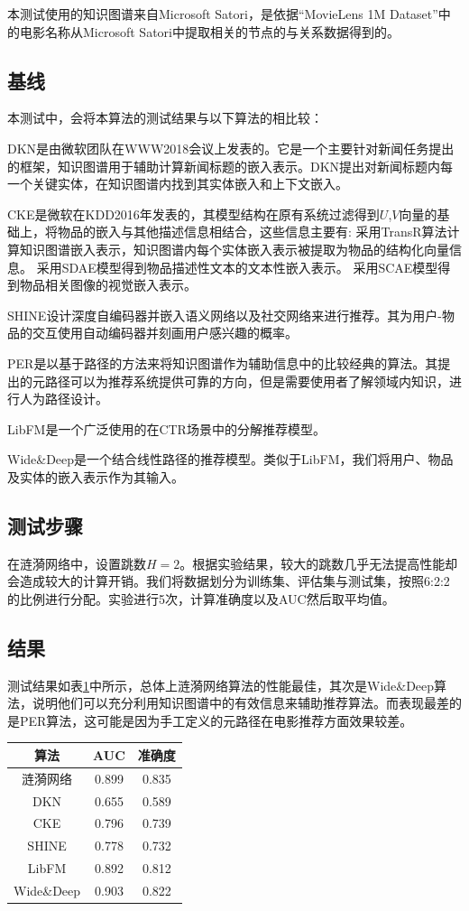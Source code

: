 \documentclass{bjfuthesis}
\begin{document}
本测试使用的知识图谱来自Microsoft Satori，是依据“MovieLens 1M Dataset”中的电影名称从Microsoft Satori中提取相关的节点的与关系数据得到的。
\subsection{基线}
本测试中，会将本算法的测试结果与以下算法的相比较：

DKN\cite{wang2018dkn}是由微软团队在WWW2018会议上发表的。它是一个主要针对新闻任务提出的框架，知识图谱用于辅助计算新闻标题的嵌入表示。DKN提出对新闻标题内每一个关键实体，在知识图谱内找到其实体嵌入和上下文嵌入。

CKE\cite{zhang2016collaborative}是微软在KDD2016年发表的，其模型结构在原有系统过滤得到$U$,$V$向量的基础上，将物品的嵌入与其他描述信息相结合，这些信息主要有:
采用TransR算法计算知识图谱嵌入表示，知识图谱内每个实体嵌入表示被提取为物品的结构化向量信息。
采用SDAE模型得到物品描述性文本的文本性嵌入表示。
采用SCAE模型得到物品相关图像的视觉嵌入表示。

SHINE\cite{wang2018shine}设计深度自编码器并嵌入语义网络以及社交网络来进行推荐。其为用户-物品的交互使用自动编码器并刻画用户感兴趣的概率。

PER\cite{yu2014personalized}是以基于路径的方法来将知识图谱作为辅助信息中的比较经典的算法。其提出的元路径可以为推荐系统提供可靠的方向，但是需要使用者了解领域内知识，进行人为路径设计。

LibFM\cite{rendle2012factorization}是一个广泛使用的在CTR场景中的分解推荐模型。

Wide\&Deep\cite{cheng2016wide}是一个结合线性路径的推荐模型。类似于LibFM，我们将用户、物品及实体的嵌入表示作为其输入。
\subsection{测试步骤}
在涟漪网络中，设置跳数$H=2$。根据实验结果，较大的跳数几乎无法提高性能却会造成较大的计算开销。我们将数据划分为训练集、评估集与测试集，按照6:2:2的比例进行分配。实验进行5次，计算准确度以及AUC然后取平均值。
\subsection{结果}
测试结果如表\ref{tab:acc-auc}中所示，总体上涟漪网络算法的性能最佳，其次是Wide\&Deep算法，说明他们可以充分利用知识图谱中的有效信息来辅助推荐算法。而表现最差的是PER算法，这可能是因为手工定义的元路径在电影推荐方面效果较差。
\begin{table}
	\label{tab:acc-auc}
	\begin{tabular}{ccc}
	 \toprule
	 算法 & AUC & 准确度 \\
	 \midrule
	 涟漪网络 & 0.899 & 0.835 \\
	  DKN & 0.655 & 0.589 \\
	  CKE & 0.796 & 0.739 \\
	  SHINE & 0.778 & 0.732\\
	  LibFM & 0.892 & 0.812\\
	  Wide\&Deep & 0.903 & 0.822\\
	  \bottomrule
	\end{tabular}
\end{table}
\end{document}
